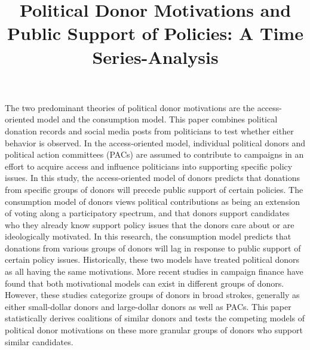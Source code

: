 \documentclass[12pt,]{article}
\title{Political Donor Motivations and Public Support of Policies: A Time
Series-Analysis  }
\author{\Large \vspace{0.05in} \newline\normalsize\emph{}  }
\date{}
\newcommand*{\authorfont}{\fontfamily{phv}\selectfont}
\renewenvironment{abstract}
 {{%
    \setlength{\leftmargin}{0mm}
    \setlength{\rightmargin}{\leftmargin}%
  }%
  \relax}
 {\endlist}
\begin{document}
	
%

{%
\setlength{\parindent}{0pt}
\thispagestyle{plain}
{\fontsize{18}{20}\selectfont\raggedright 
\maketitle  %

}

{
   \vskip 13.5pt\relax \normalsize\fontsize{11}{12} 
\textbf{\authorfont } \hskip 15pt \emph{\small }   

}

}








\begin{abstract}

    \hbox{\vrule height .2pt width 39.14pc}

    \vskip 8.5pt %

\noindent The two predominant theories of political donor motivations are the
access-oriented model and the consumption model. This paper combines
political donation records and social media posts from politicians to
test whether either behavior is observed. In the access-oriented model,
individual political donors and political action committees (PACs) are
assumed to contribute to campaigns in an effort to acquire access and
influence politicians into supporting specific policy issues. In this
study, the access-oriented model of donors predicts that donations from
specific groups of donors will precede public support of certain
policies. The consumption model of donors views political contributions
as being an extension of voting along a participatory spectrum, and that
donors support candidates who they already know support policy issues
that the donors care about or are ideologically motivated. In this
research, the consumption model predicts that donations from various
groups of donors will lag in response to public support of certain
policy issues. Historically, these two models have treated political
donors as all having the same motivations. More recent studies in
campaign finance have found that both motivational models can exist in
different groups of donors. However, these studies categorize groups of
donors in broad strokes, generally as either small-dollar donors and
large-dollar donors as well as PACs. This paper statistically derives
coalitions of similar donors and tests the competing models of political
donor motivations on these more granular groups of donors who support
similar candidates.


    \hbox{\vrule height .2pt width 39.14pc}


\end{abstract}
\end{document}

